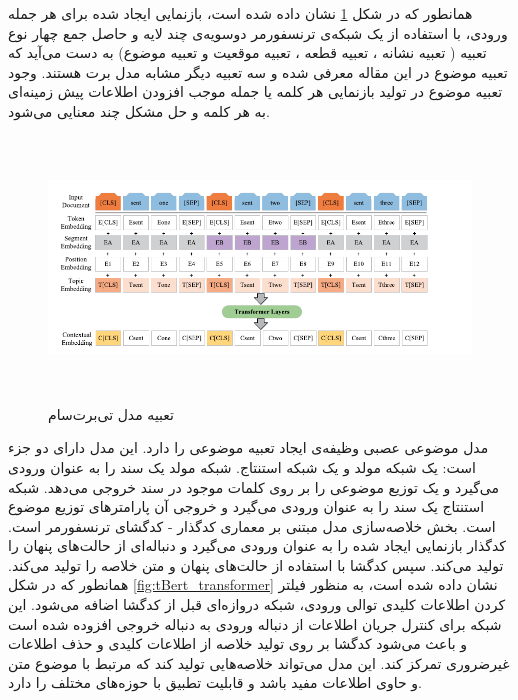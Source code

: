 همانطور که در شکل \ref{fig:tBert_embded} نشان داده شده است، بازنمایی ایجاد شده برای هر جمله ورودی، با استفاده از یک شبکه‌ی ترنسفورمر دوسویه‌ی
چند لایه و حاصل جمع چهار نوع تعبیه ( تعبیه نشانه
، تعبیه قطعه
، تعبیه موقعیت و تعبیه موضوع) به دست ‌می‌آید که تعبیه موضوع در این مقاله معرفی شده و سه تعبیه دیگر مشابه مدل برت هستند. وجود تعبیه موضوع در تولید بازنمایی هر کلمه یا جمله موجب افزودن اطلاعات پیش زمینه‌ای به هر کلمه و حل مشکل چند معنایی می‌شود.
\begin{figure}[!h]
	\begin{center}
		\includegraphics[height=7cm]{TbertSum_embedding.png}
	\end{center}
	\caption{ تعبیه مدل تی‌برت‌سام \cite{Ma2022TBERTSumTT}}
	\label{fig:tBert_embded}
	\medskip
	\small
\end{figure}

مدل موضوعی عصبی وظیفه‌ی ایجاد تعبیه موضوعی را دارد. این مدل دارای دو جزء است: یک شبکه مولد و یک شبکه استنتاج.
شبکه مولد یک سند را به عنوان ورودی می‌گیرد و یک توزیع موضوعی را بر روی کلمات موجود در سند خروجی می‌دهد.
شبکه استنتاج یک سند را به عنوان ورودی می‌گیرد و خروجی آن پارامترهای توزیع موضوع است. 
بخش خلاصه‌سازی مدل مبتنی بر معماری کدگذار - کدگشای ترنسفورمر است. کدگذار بازنمایی ایجاد شده را به عنوان ورودی می‌گیرد و دنباله‌ای از حالت‌های پنهان را تولید می‌کند. سپس کدگشا با استفاده از  حالت‌های پنهان و متن خلاصه را تولید می‌کند. همانطور که در شکل 
\ref{fig:tBert_transformer}
نشان داده شده است، به منظور فیلتر کردن اطلاعات کلیدی توالی ورودی، شبکه دروازه‌ای قبل از کدگشا اضافه می‌شود.
این شبکه برای کنترل جریان اطلاعات از دنباله ورودی به دنباله خروجی افزوده شده است و باعث می‌شود کدگشا بر روی تولید خلاصه از اطلاعات کلیدی و حذف اطلاعات غیرضروری تمرکز کند. این مدل می‌تواند خلاصه‌هایی تولید کند که مرتبط با موضوع متن و حاوی اطلاعات مفید باشد و قابلیت تطبیق با حوزه‌های مختلف را دارد.

